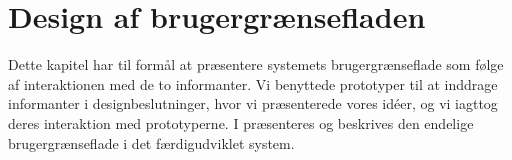 \chapter{Design af brugergrænsefladen}
\label{chap:designafbrugergraenseflade}

Dette kapitel har til formål at præsentere systemets brugergrænseflade som følge af interaktionen med de to informanter. Vi benyttede prototyper til at inddrage informanter i designbeslutninger, hvor vi præsenterede vores idéer, og vi iagttog deres interaktion med prototyperne. I  præsenteres og beskrives den endelige brugergrænseflade i det færdigudviklet system.



